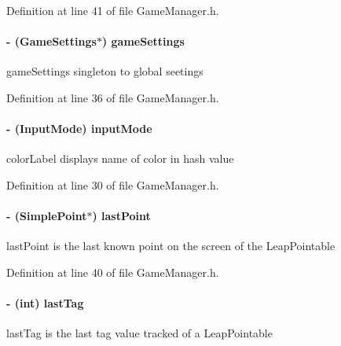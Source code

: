Definition at line 41 of file Game\-Manager.\-h.

\hypertarget{interface_game_manager_a97ff3b8cd0cbc6baf6f5abe3bb3417ca}{
\paragraph[{game\-Settings}]{\setlength{\rightskip}{0pt plus 5cm}-\/ ({\bf Game\-Settings}$\ast$) game\-Settings\hspace{0.3cm}{\ttfamily [protected]}}}\label{d4/d94/interface_game_manager_a97ff3b8cd0cbc6baf6f5abe3bb3417ca}
game\-Settings singleton to global seetings 

Definition at line 36 of file Game\-Manager.\-h.

\hypertarget{interface_game_manager_a43f8cf09eea5b0766c73b0d2b258644c}{
\paragraph[{input\-Mode}]{\setlength{\rightskip}{0pt plus 5cm}-\/ (Input\-Mode) input\-Mode\hspace{0.3cm}{\ttfamily [protected]}}}\label{d4/d94/interface_game_manager_a43f8cf09eea5b0766c73b0d2b258644c}
color\-Label displays name of color in hash value 

Definition at line 30 of file Game\-Manager.\-h.

\hypertarget{interface_game_manager_a4f2a6986ffdbc41d661e90deaee4551a}{
\paragraph[{last\-Point}]{\setlength{\rightskip}{0pt plus 5cm}-\/ ({\bf Simple\-Point}$\ast$) last\-Point\hspace{0.3cm}{\ttfamily [protected]}}}\label{d4/d94/interface_game_manager_a4f2a6986ffdbc41d661e90deaee4551a}
last\-Point is the last known point on the screen of the Leap\-Pointable 

Definition at line 40 of file Game\-Manager.\-h.

\hypertarget{interface_game_manager_a0b83b09829718f85c17d64f6ee06d441}{
\paragraph[{last\-Tag}]{\setlength{\rightskip}{0pt plus 5cm}-\/ (int) last\-Tag\hspace{0.3cm}{\ttfamily [protected]}}}\label{d4/d94/interface_game_manager_a0b83b09829718f85c17d64f6ee06d441}
last\-Tag is the last tag value tracked of a Leap\-Pointable 

